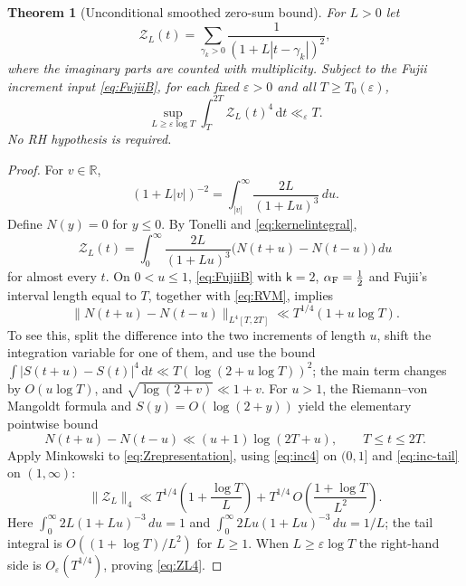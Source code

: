 \documentclass[11pt,a4paper]{article}
\numberwithin{equation}{section}
\newtheorem{theorem}{Theorem}[section]
\theoremstyle{definition}
\theoremstyle{remark}
\newcommand{\dd}{\,\mathrm dt}
\begin{document}
\begin{theorem}[Unconditional smoothed zero-sum bound]\label{thm:ZL}
For $L>0$ let
\begin{equation}\label{eq:ZL}
\mathcal Z_L(t)=\sum_{\gamma_k>0}\frac1{(1+L|t-\gamma_k|)^2},
\end{equation}
where the imaginary parts are counted with multiplicity. Subject to the Fujii increment input \eqref{eq:FujiiB}, for each fixed $\varepsilon>0$ and all $T\ge T_0(\varepsilon)$,
\begin{equation}\label{eq:ZL4}
\boxed{\displaystyle
\sup_{L\ge\varepsilon\log T}\int_T^{2T}\mathcal Z_L(t)^4\dd
\ll_\varepsilon T.}
\end{equation}
No RH hypothesis is required.
\end{theorem}
\begin{proof}
For $v\in\mathbb R$,
\begin{equation}\label{eq:kernelintegral}
(1+L|v|)^{-2}=\int_{|v|}^\infty\frac{2L}{(1+Lu)^3}\,du.
\end{equation}
Define $N(y)=0$ for $y\le0$. By Tonelli and \eqref{eq:kernelintegral},
\begin{equation}\label{eq:Zrepresentation}
\mathcal Z_L(t)=\int_0^\infty\frac{2L}{(1+Lu)^3}
\bigl(N(t+u)-N(t-u)\bigr)\,du
\end{equation}
for almost every $t$. On $0<u\le1$, \eqref{eq:FujiiB} with $\mathsf k=2$, $\alpha_{\rm F}=\frac12$ and Fujii's interval length equal to $T$, together with \eqref{eq:RVM}, implies
\begin{equation}\label{eq:inc4}
\|N(t+u)-N(t-u)\|_{L^4[T,2T]}
\ll T^{1/4}(1+u\log T).
\end{equation}
To see this, split the difference into the two increments of length $u$, shift the integration variable for one of them, and use the bound $\int |S(t+u)-S(t)|^4\dd\ll T(\log(2+u\log T))^2$; the main term changes by $O(u\log T)$, and $\sqrt{\log(2+v)}\ll1+v$.
For $u>1$, the Riemann--von Mangoldt formula and $S(y)=O(\log(2+y))$ yield the elementary pointwise bound
\begin{equation}\label{eq:inc-tail}
N(t+u)-N(t-u)\ll(u+1)\log(2T+u),\qquad T\le t\le2T.
\end{equation}
Apply Minkowski to \eqref{eq:Zrepresentation}, using \eqref{eq:inc4} on $(0,1]$ and \eqref{eq:inc-tail} on $(1,\infty)$:
\begin{equation}
\|\mathcal Z_L\|_4\ll T^{1/4}
\left(1+\frac{\log T}{L}\right)
+T^{1/4}\,O\!\left(\frac{1+\log T}{L^2}\right).
\end{equation}
Here $\int_0^\infty 2L(1+Lu)^{-3}\,du=1$ and
$\int_0^\infty 2Lu(1+Lu)^{-3}\,du=1/L$; the tail integral is $O((1+\log T)/L^2)$ for $L\ge1$.
When $L\ge\varepsilon\log T$ the right-hand side is $O_\varepsilon(T^{1/4})$, proving \eqref{eq:ZL4}.
\end{proof}
\end{document}
